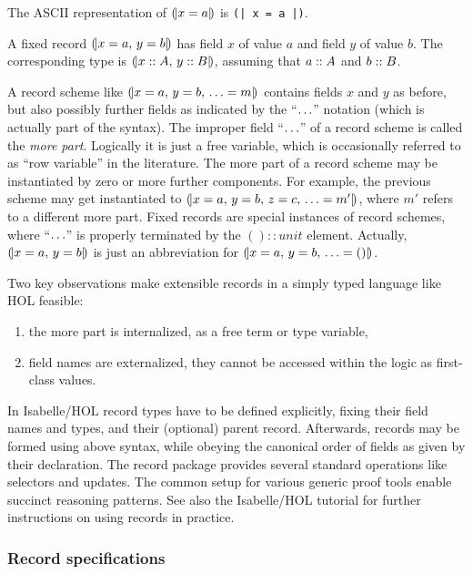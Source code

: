 \noindent The ASCII representation of $\mathopen{(\!|} x = a \mathclose{|\!)}$ is \texttt{(| x = a |)}.

A fixed record $\mathopen{(\!|} x = a\mathpunct{,\,} y = b \mathclose{|\!)}$ has field $x$ of value $a$ and field
$y$ of value $b$.  The corresponding type is $\mathopen{(\!|} x \mathrel{::} A\mathpunct{,\,} y \mathrel{::} B \mathclose{|\!)}$,
assuming that $a \mathrel{::} A$ and $b \mathrel{::} B$.

A record scheme like $\mathopen{(\!|} x = a\mathpunct{,\,} y = b\mathpunct{,\,} \ldots = m \mathclose{|\!)}$ contains fields
$x$ and $y$ as before, but also possibly further fields as indicated by the
``$\ldots$'' notation (which is actually part of the syntax).  The improper
field ``$\ldots$'' of a record scheme is called the \emph{more part}.
Logically it is just a free variable, which is occasionally referred to as
``row variable'' in the literature.  The more part of a record scheme may be
instantiated by zero or more further components.  For example, the previous
scheme may get instantiated to $\mathopen{(\!|} x = a\mathpunct{,\,} y = b\mathpunct{,\,} z = c\mathpunct{,\,} \ldots =
  m' \mathclose{|\!)}$, where $m'$ refers to a different more part.  Fixed records are special
instances of record schemes, where ``$\ldots$'' is properly terminated by the
$() :: unit$ element.  Actually, $\mathopen{(\!|} x = a\mathpunct{,\,} y = b \mathclose{|\!)}$ is just an
abbreviation for $\mathopen{(\!|} x = a\mathpunct{,\,} y = b\mathpunct{,\,} \ldots = () \mathclose{|\!)}$.

\medskip

Two key observations make extensible records in a simply typed language like
HOL feasible:
\begin{enumerate}
\item the more part is internalized, as a free term or type variable,
\item field names are externalized, they cannot be accessed within the logic
  as first-class values.
\end{enumerate}

\medskip

In Isabelle/HOL record types have to be defined explicitly, fixing their field
names and types, and their (optional) parent record.  Afterwards, records may
be formed using above syntax, while obeying the canonical order of fields as
given by their declaration.  The record package provides several standard
operations like selectors and updates.  The common setup for various generic
proof tools enable succinct reasoning patterns.  See also the Isabelle/HOL
tutorial \cite{isabelle-hol-book} for further instructions on using records in
practice.


\subsubsection{Record specifications}

